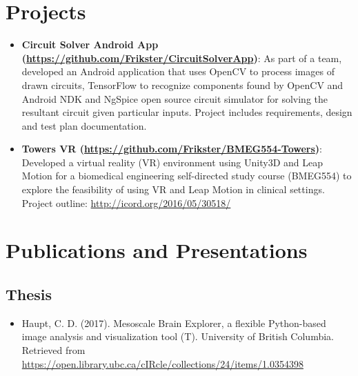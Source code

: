 \documentclass[11pt,a4paper,sans]{moderncv}        %
\begin{document}
\section{Projects}
  \begin{itemize} 
      \item\textbf{Circuit Solver Android App (\href{https://github.com/Frikster/CircuitSolverApp}{https://github.com/Frikster/CircuitSolverApp})}:
      {As part of a team, developed an Android application that uses OpenCV to process images of drawn circuits, TensorFlow to recognize components found by OpenCV and Android NDK and NgSpice open source circuit simulator for solving the resultant circuit given particular inputs. Project includes requirements, design and test plan documentation.}
    \item\textbf{Towers VR (\href{https://github.com/Frikster/BMEG554-Towers}{https://github.com/Frikster/BMEG554-Towers})}:
      {Developed a virtual reality (VR) environment using Unity3D and Leap Motion for a biomedical engineering self-directed study course (BMEG554) to explore the feasibility of using VR and Leap Motion in clinical settings. Project outline: \href{http://icord.org/2016/05/30518/}{http://icord.org/2016/05/30518/} }
  \end{itemize}
  
\section{Publications and Presentations}
\subsection{Thesis}
\begin{itemize}
\item Haupt, C. D. (2017). Mesoscale Brain Explorer, a flexible Python-based image analysis and visualization tool (T). University of British Columbia. Retrieved from \href{https://open.library.ubc.ca/cIRcle/collections/24/items/1.0354398}{https://open.library.ubc.ca/cIRcle/collections/24/items/1.0354398}
\end{itemize}
\vspace{5pt}
\end{document}
